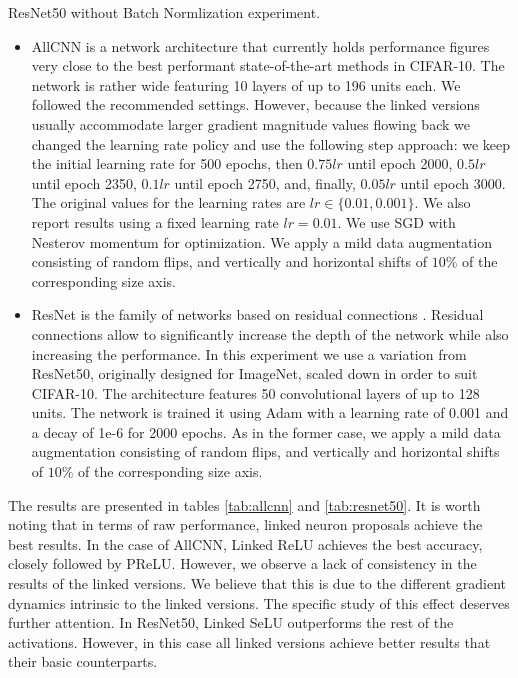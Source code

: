 \documentclass[10pt,twocolumn,letterpaper]{article}
\begin{document}
\begin{table}[!ht]
    \centering
    
    
    
    \caption{ResNet50 without Batch Normlization experiment.}
    \label{tab:resnet50_nobatchnorm}
\end{table}


\begin{itemize}
    \item AllCNN \cite{allcnn} is a network architecture that currently holds performance figures very close to the best performant state-of-the-art methods in CIFAR-10. The network is rather wide featuring 10 layers of up to 196 units each. We followed the recommended settings. However, because the linked versions usually accommodate larger gradient magnitude values flowing back we changed the learning rate policy and use the following step approach: we keep the initial learning rate for 500 epochs, then $0.75 lr$ until epoch 2000, $ 0.5 lr$ until epoch 2350, $0.1 lr$ until epoch 2750, and, finally,  $0.05 lr$ until epoch 3000. The original values for the learning rates are $lr \in \{0.01, 0.001\} $. We also report results using a fixed learning rate $lr = 0.01$. We use SGD with Nesterov momentum for optimization. We apply a mild data augmentation consisting of random flips, and vertically and horizontal shifts of $10\%$ of the corresponding size axis.
    
    \item
    ResNet is the family of networks based on residual connections \cite{resnet}. Residual connections allow to significantly increase the depth of the network while also increasing the performance. In this experiment we use a variation from ResNet50, originally designed for ImageNet, scaled down in order to suit CIFAR-10. The architecture features 50 convolutional layers of up to 128 units. The network is trained it using Adam \cite{adam} with a learning rate of 0.001 and a decay of 1e-6 for 2000 epochs. As in the former case, we apply a mild data augmentation consisting of random flips, and vertically and horizontal shifts of $10\%$ of the corresponding size axis. 
\end{itemize}

The results are presented in tables \ref{tab:allcnn} and \ref{tab:resnet50}. It is worth noting that in terms of raw performance, linked neuron proposals achieve the best results. In the case of AllCNN, Linked ReLU achieves the best accuracy, closely followed by PReLU. However, we observe a lack of consistency in the results of the linked versions. We believe that this is due to the different gradient dynamics intrinsic to the linked versions. The specific study of this effect deserves further attention. In ResNet50, Linked SeLU outperforms the rest of the activations. However, in this case all linked versions achieve better results that their basic counterparts. 
\end{document}
